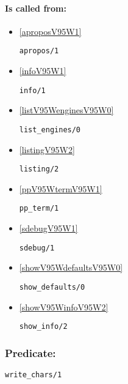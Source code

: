 \paragraph{Is called from:} 
\begin{itemize}
\item \ref{aproposV95W1} 
\begin{verbatim}
apropos/1
\end{verbatim}

\item \ref{infoV95W1} 
\begin{verbatim}
info/1
\end{verbatim}

\item \ref{listV95WenginesV95W0} 
\begin{verbatim}
list_engines/0
\end{verbatim}

\item \ref{listingV95W2} 
\begin{verbatim}
listing/2
\end{verbatim}

\item \ref{ppV95WtermV95W1} 
\begin{verbatim}
pp_term/1
\end{verbatim}

\item \ref{sdebugV95W1} 
\begin{verbatim}
sdebug/1
\end{verbatim}

\item \ref{showV95WdefaultsV95W0} 
\begin{verbatim}
show_defaults/0
\end{verbatim}

\item \ref{showV95WinfoV95W2} 
\begin{verbatim}
show_info/2
\end{verbatim}

\end{itemize}

\subsubsection{Predicate:} \label{writeV95WcharsV95W1}

\begin{verbatim}
write_chars/1
\end{verbatim}

